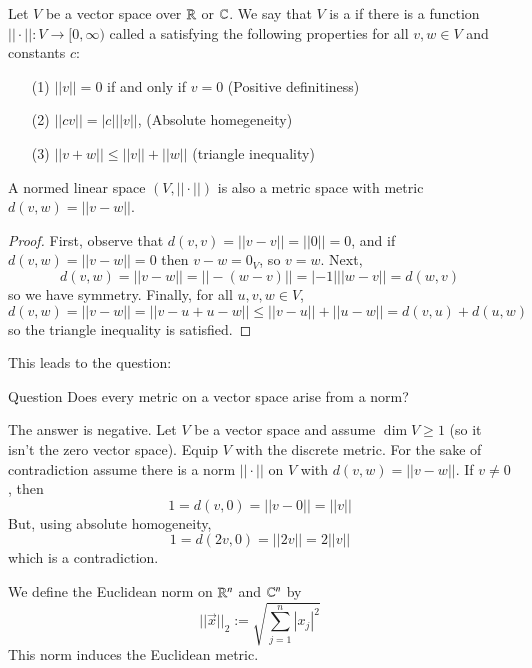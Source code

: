 \begin{definition}
    Let $V$ be a vector space over $\mathbb R$ or $\mathbb C$. We say that $V$ is a  if there is a function $||\cdot||:V\rightarrow [0,\infty)$ called a  satisfying the following properties for all $v,w \in V$ and constants $c$: \begin{itemize}
        \item[(1)] $||v|| = 0$ if and only if $v = 0$ (Positive definitiness)
        \item[(2)] $||cv|| = |c|||v||$, (Absolute homegeneity)
        \item[(3)] $||v+w|| \leq ||v|| + ||w||$ (triangle inequality)
    \end{itemize}
\end{definition}

\begin{proposition}
    A normed linear space $(V,||\cdot||)$ is also a metric space with metric $d(v,w) = ||v-w||$.
\end{proposition}
\begin{proof}
    First, observe that $d(v,v) = ||v-v|| = ||0|| = 0$, and if $d(v,w) = ||v-w|| = 0$ then $v-w = 0_V$, so $v = w$. Next, $$d(v,w) = ||v-w|| = ||-(w-v)|| = |-1|||w-v|| = d(w,v)$$ so we have symmetry. Finally, for all $u,v,w \in V$, $$d(v,w) = ||v-w|| = ||v-u+u-w|| \leq ||v-u||+||u-w|| = d(v,u)+d(u,w)$$ so the triangle inequality is satisfied.
\end{proof}


This leads to the question: 
\begin{question}{Question}
    Does every metric on a vector space arise from a norm?
\end{question}
The answer is negative. Let $V$ be a vector space and assume $\dim V \geq 1$ (so it isn't the zero vector space). Equip $V$ with the discrete metric. For the sake of contradiction assume there is a norm $||\cdot||$ on $V$ with $d(v,w) = ||v-w||$. If $v \neq 0$, then $$1 = d(v,0) = ||v-0|| = ||v||$$ But, using absolute homogeneity, $$1 = d(2v,0) = ||2v|| = 2||v||$$ which is a contradiction.

\begin{example}
    We define the Euclidean norm on $\mathbb R^n$ and $\mathbb C^n$ by $$||\vec{x}||_2 := \sqrt{\sum_{j=1}^n|x_j|^2}$$ This norm induces the Euclidean metric.
\end{example}

